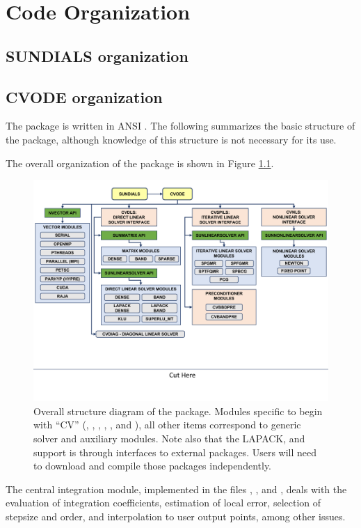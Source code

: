 \chapter{Code Organization}\label{s:organization}

\section{SUNDIALS organization}\label{ss:sun_org}


\section{CVODE organization}\label{ss:cvode_org}

The {\cvode} package is written in ANSI {\CC}. The following
summarizes the basic structure of the package, although knowledge
of this structure is not necessary for its use.

The overall organization of the {\cvode} package is shown in Figure
\ref{f:cvorg}. 
\begin{figure}[!ht]
{\centerline{\includegraphics[width=\textwidth]{cvorg}}}
\caption [Overall structure diagram of the {\cvode} package]
{Overall structure diagram of the {\cvode} package.
  Modules specific to {\cvode} begin with ``CV'' ({\cvdls},  {\cvdiag},
  {\cvspils}, {\cvbbdpre}, {\cvbandpre}, and {\cvnls}), all other items correspond
  to generic solver and auxiliary modules. 
  Note also that the LAPACK, {\klu} and {\superlumt} support is
  through interfaces to external packages.  Users will need to
  download and compile those packages independently.}
\label{f:cvorg}
\end{figure}
The central integration module, implemented in the files ,
, and , deals with the evaluation of integration
coefficients, estimation of local
error, selection of stepsize and order, and interpolation to user output
points, among other issues.

